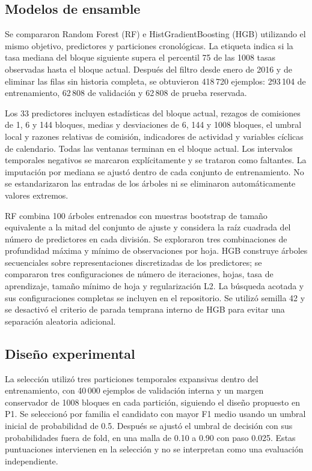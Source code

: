 \subsection{Modelos de ensamble}
Se compararon Random Forest (RF) e HistGradientBoosting (HGB) utilizando el mismo objetivo, predictores y particiones cronológicas. La etiqueta indica si la tasa mediana del bloque siguiente supera el percentil 75 de las 1008 tasas observadas hasta el bloque actual. Después del filtro desde enero de 2016 y de eliminar las filas sin historia completa, se obtuvieron 418\,720 ejemplos: 293\,104 de entrenamiento, 62\,808 de validación y 62\,808 de prueba reservada.

Los 33 predictores incluyen estadísticas del bloque actual, rezagos de comisiones de 1, 6 y 144 bloques, medias y desviaciones de 6, 144 y 1008 bloques, el umbral local y razones relativas de comisión, indicadores de actividad y variables cíclicas de calendario. Todas las ventanas terminan en el bloque actual. Los intervalos temporales negativos se marcaron explícitamente y se trataron como faltantes. La imputación por mediana se ajustó dentro de cada conjunto de entrenamiento. No se estandarizaron las entradas de los árboles ni se eliminaron automáticamente valores extremos.

RF combina 100 árboles entrenados con muestras bootstrap de tamaño equivalente a la mitad del conjunto de ajuste y considera la raíz cuadrada del número de predictores en cada división. Se exploraron tres combinaciones de profundidad máxima y mínimo de observaciones por hoja. HGB construye árboles secuenciales sobre representaciones discretizadas de los predictores; se compararon tres configuraciones de número de iteraciones, hojas, tasa de aprendizaje, tamaño mínimo de hoja y regularización L2. La búsqueda acotada y sus configuraciones completas se incluyen en el repositorio. Se utilizó semilla 42 y se desactivó el criterio de parada temprana interno de HGB para evitar una separación aleatoria adicional.

\subsection{Diseño experimental}
La selección utilizó tres particiones temporales expansivas dentro del entrenamiento, con 40\,000 ejemplos de validación interna y un margen conservador de 1008 bloques en cada partición, siguiendo el diseño propuesto en P1. Se seleccionó por familia el candidato con mayor F1 medio usando un umbral inicial de probabilidad de 0.5. Después se ajustó el umbral de decisión con sus probabilidades fuera de fold, en una malla de 0.10 a 0.90 con paso 0.025. Estas puntuaciones intervienen en la selección y no se interpretan como una evaluación independiente.

